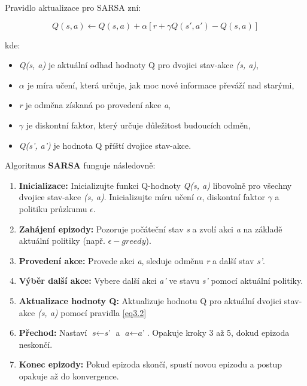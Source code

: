Pravidlo aktualizace pro SARSA zní:

\begin{equation}
Q(s, a) \leftarrow Q(s, a) + \alpha \left[ r + \gamma Q(s', a') - Q(s, a) \right]
\label{eq3.2}
\end{equation}

kde:
\begin{itemize}
	\item \textit{Q(s, a)} je aktuální odhad hodnoty Q pro dvojici stav-akce \textit{(s, a)},
	\item \textit{$\alpha$} je míra učení, která určuje, jak moc nové informace převáží nad starými,
	\item \textit{r} je odměna získaná po provedení akce \textit{a},
	\item \textit{$\gamma$} je diskontní faktor, který určuje důležitost budoucích odměn,
	\item \textit{Q(s', a')} je hodnota Q příští dvojice stav-akce.
\end{itemize}

Algoritmus \textbf{SARSA} funguje následovně:
\begin{enumerate}
    \item \textbf{Inicializace:} Inicializujte funkci Q-hodnoty \textit{Q(s, a)} libovolně pro všechny dvojice stav-akce \textit{(s, a)}. Inicializujte míru učení \textit{$\alpha$}, diskontní faktor \textit{$\gamma$} a politiku průzkumu \textit{$\epsilon$}.
    
    \item \textbf{Zahájení epizody:} Pozoruje počáteční stav \textit{s} a zvolí akci \textit{a} na základě aktuální politiky (např. \textit{$\epsilon-greedy$}).
    
    \item \textbf{Provedení akce:} Provede akci \textit{a}, sleduje odměnu \textit{r} a další stav \textit{s'}.
    
    \item \textbf{Výběr další akce:} Vybere další akci \textit{a'} ve stavu \textit{s'} pomocí aktuální politiky.
    
    \item \textbf{Aktualizace hodnoty Q:} Aktualizuje hodnotu Q pro aktuální dvojici stav-akce \textit{(s, a)} pomocí pravidla \ref{eq3.2}
 
    
\item \textbf{Přechod:} Nastaví $\textit{s} \leftarrow \textit{s'}$ a $\textit{a} \leftarrow \textit{a'}$. Opakuje kroky 3 až 5, dokud epizoda neskončí.
    
    \item \textbf{Konec epizody:} Pokud epizoda skončí, spustí novou epizodu a postup opakuje až do konvergence.
\end{enumerate}

